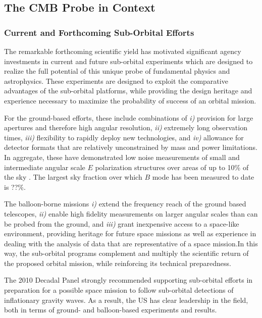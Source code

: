 
\subsection{The CMB Probe in Context}
\label{sec:spacemission}

\vspace{-0.05in}

\subsubsection{Current and Forthcoming Sub-Orbital Efforts}

The remarkable forthcoming scientific yield has motivated significant agency investments 
in current and future sub-orbital experiments which are designed to realize the full potential of this
unique probe of fundamental physics and astrophysics.    These experiments are designed 
to exploit the comparative advantages of the sub-orbital platforms, while providing the design heritage and 
experience necessary to maximize the probability of success of an orbital mission. 

For the ground-based efforts, these include combinations of {\it i)}
provision for large apertures and therefore high angular
resolution, {\it ii)} extremely long observation times, {\it iii)}
flexibility to rapidly deploy new technologies, and {\it iv)}
allowance for detector formats that are relatively unconstrained by
mass and power limitations.  In aggregate, these have demonstrated low
noise measurements of small and intermediate angular scale $E$ polarization 
structures over areas of up to 10\% of the sky . The largest sky fraction 
over which $B$ mode has been measured to date is ??\%. 

The balloon-borne missions {\it i)} extend the frequency reach of the ground based telescopes, 
{\it ii)} enable high fidelity measurements on larger angular scales than can be probed from the 
ground, and {\it iii)} grant inexpensive access to a space-like environment, providing heritage 
for future space missions as well as experience in dealing with the analysis of data that 
are representative of a space mission.In this way, the sub-orbital programs complement and 
multiply the scientific return of the proposed orbital mission, while reinforcing its technical 
preparedness.  

The 2010 Decadal Panel strongly recommended supporting sub-orbital efforts in preparation 
for a possible space mission to follow sub-orbital detections of inflationary gravity waves. 
As a result, the US has clear leadership in the field, both in terms of ground- and balloon-based 
experiments and results. 

